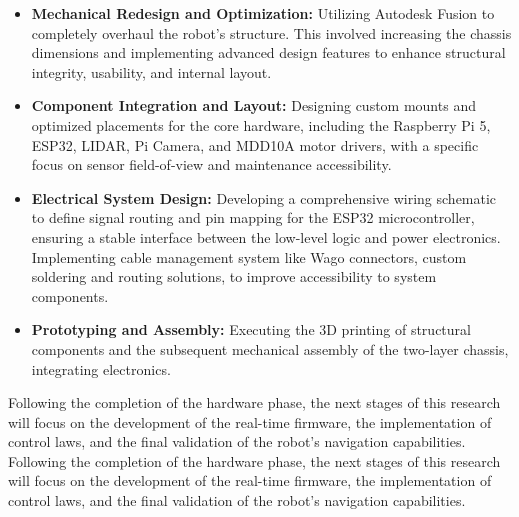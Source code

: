 \begin{itemize}
    \item \textbf{Mechanical Redesign and Optimization:} Utilizing Autodesk Fusion to completely overhaul the robot's structure. This involved increasing the chassis dimensions and implementing advanced design features to enhance structural integrity, usability, and internal layout.
    \item \textbf{Component Integration and Layout:} Designing custom mounts and optimized placements for the core hardware, including the Raspberry Pi 5, ESP32, LIDAR, Pi Camera, and MDD10A motor drivers, with a specific focus on sensor field-of-view and maintenance accessibility.
    \item \textbf{Electrical System Design:} Developing a comprehensive wiring schematic to define signal routing and pin mapping for the ESP32 microcontroller, ensuring a stable interface between the low-level logic and power electronics. Implementing cable management system like Wago connectors, custom soldering and routing solutions, to improve accessibility to system components.
    \item \textbf{Prototyping and Assembly:} Executing the 3D printing of structural components and the subsequent mechanical assembly of the two-layer chassis, integrating electronics.
\end{itemize}

Following the completion of the hardware phase, the next stages of this research will focus on the development of the real-time firmware, the implementation of control laws, and the final validation of the robot's navigation capabilities.
Following the completion of the hardware phase, the next stages of this research will focus on the development of the real-time firmware, the implementation of control laws, and the final validation of the robot's navigation capabilities.